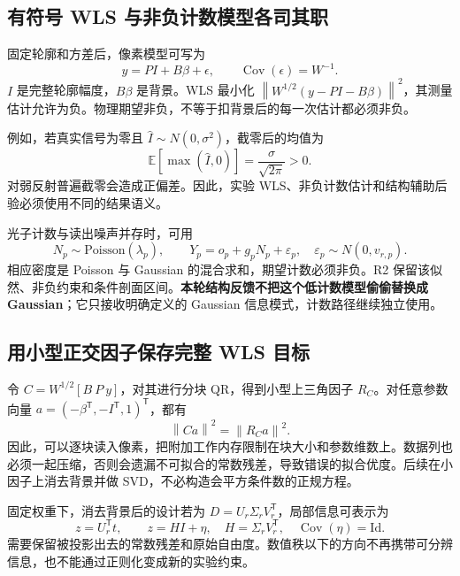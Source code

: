 \documentclass[UTF8,11pt,a4paper,fontset=fandol]{ctexart}
\newcommand{\T}{^{\mathsf T}}
\newcommand{\Id}{\mathrm{Id}}
\newcommand{\Cov}{\operatorname{Cov}}
\newcommand{\norm}[1]{\left\lVert#1\right\rVert}
\begin{document}
\subsection{有符号 WLS 与非负计数模型各司其职}

固定轮廓和方差后，像素模型可写为
\begin{equation}
 y=PI+B\beta+\epsilon,\qquad \Cov(\epsilon)=W^{-1}.
\end{equation}
$I$ 是完整轮廓幅度，$B\beta$ 是背景。WLS 最小化 $\norm{W^{1/2}(y-PI-B\beta)}^2$，其测量估计允许为负。物理期望非负，不等于扣背景后的每一次估计都必须非负。

例如，若真实信号为零且 $\widehat I\sim N(0,\sigma^2)$，截零后的均值为
\begin{equation}
 \mathbb E[\max(\widehat I,0)]=\frac{\sigma}{\sqrt{2\pi}}>0.
\end{equation}
对弱反射普遍截零会造成正偏差。因此，实验 WLS、非负计数估计和结构辅助后验必须使用不同的结果语义。

光子计数与读出噪声并存时，可用
\begin{equation}
 N_p\sim\mathrm{Poisson}(\lambda_p),\qquad
 Y_p=o_p+g_pN_p+\varepsilon_p,\quad
 \varepsilon_p\sim N(0,v_{r,p}).
\end{equation}
相应密度是 Poisson 与 Gaussian 的混合求和，期望计数必须非负。R2 保留该似然、非负约束和条件剖面区间。\textbf{本轮结构反馈不把这个低计数模型偷偷替换成 Gaussian}；它只接收明确定义的 Gaussian 信息模式，计数路径继续独立使用。

\subsection{用小型正交因子保存完整 WLS 目标}

令 $C=W^{1/2}[B\ P\ y]$，对其进行分块 QR，得到小型上三角因子 $R_C$。对任意参数向量 $a=(-\beta\T,-I\T,1)\T$，都有
\begin{equation}
 \norm{Ca}^2=\norm{R_Ca}^2.
\end{equation}
因此，可以逐块读入像素，把附加工作内存限制在块大小和参数维数上。数据列也必须一起压缩，否则会遗漏不可拟合的常数残差，导致错误的拟合优度。后续在小因子上消去背景并做 SVD，不必构造会平方条件数的正规方程。

固定权重下，消去背景后的设计若为 $D=U_r\Sigma_rV_r\T$，局部信息可表示为
\begin{equation}
 z=U_r\T t,\qquad z=H I+\eta,\quad H=\Sigma_rV_r\T,
 \quad\Cov(\eta)=\Id.
\end{equation}
需要保留被投影出去的常数残差和原始自由度。数值秩以下的方向不再携带可分辨信息，也不能通过正则化变成新的实验约束。
\end{document}
